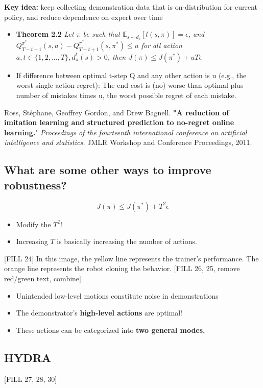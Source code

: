 \documentclass[10pt]{article}
\begin{document}
\textbf{Key idea:} keep collecting demonstration data that is on-distribution for current policy, and reduce dependence on expert over time
\begin{itemize}
	\item \textbf{Theorem 2.2} \textit{Let $\pi$ be such that $\mathbb{E}_{s \sim d_s} [l(s, \pi)] = \epsilon$, and $Q_{T - t + 1}^{\pi^*} (s, a) - Q_{T - t + 1}^{\pi^*}(s, \pi^*) \leq u$ for all action $a, t \in \{1, 2, \dots, T\}, d_\pi^t (s) > 0$, then $J(\pi) \leq J(\pi^*) + uT\epsilon$}
	\item If difference between optimal t-step Q and any other action is u (e.g., the worst single action regret): The end cost is (no) worse than optimal plus number of mistakes times u, the worst possible regret of each mistake.
\end{itemize}
Ross, Stéphane, Geoffrey Gordon, and Drew Bagnell. \textbf{"A reduction of imitation learning and structured prediction to no-regret online learning.}" \textit{Proceedings of the fourteenth international conference on artificial intelligence and statistics.} JMLR Workshop and Conference Proceedings, 2011.

\subsection*{What are some other ways to improve robustness?}
\[J(\pi) \leq J(\pi^*) + T^2 \epsilon\]
\begin{itemize}
	\item Modify the $T^2$!
	\item Increasing $T$ is basically increasing the number of actions.
\end{itemize}

[FILL 24]
In this image, the yellow line represents the trainer's performance.  The orange line represents the robot cloning the behavior.
[FILL 26, 25, remove red/green text, combine]
\begin{itemize}
	\item Unintended low-level motions constitute noise in demonstrations
	\item The demonstrator's \textbf{high-level actions} are optimal!
	\item These actions can be categorized into \textbf{two general modes.}
\end{itemize}

\subsection*{HYDRA}
[FILL 27, 28, 30]
\end{document}
